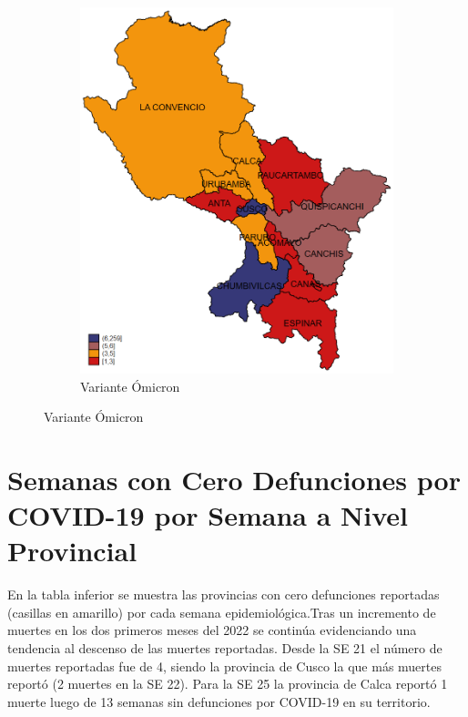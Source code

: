 \documentclass[12pt,a4paper,openany]{book}
\begin{document}
\begin{figure}[h]
\begin{subfigure}[b]{0.40\textwidth}
			\includegraphics[width=\textwidth]{../figuras/variantes_provincial_omicron.png}
			\caption{Variante Ómicron}
		\end{subfigure}
	\end{figure}
	
	\clearpage
	
	
	
	\clearpage
	\section*{Semanas con Cero Defunciones por COVID-19 por Semana a Nivel Provincial}
	
	\noindent En la tabla inferior se muestra las provincias con cero defunciones reportadas (casillas en amarillo) por cada semana epidemiológica.Tras un incremento de muertes en los dos primeros meses del 2022 se continúa evidenciando una tendencia al descenso de las muertes reportadas. Desde la SE 21 el número de muertes reportadas fue de 4, siendo la provincia de Cusco la que más muertes reportó (2 muertes en la SE 22). Para la SE 25 la provincia de Calca reportó 1 muerte luego de 13 semanas sin defunciones por COVID-19 en su territorio. 
	
\end{document}
